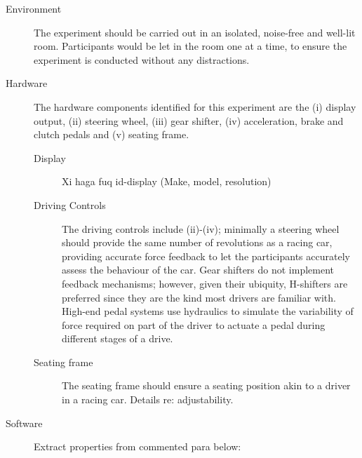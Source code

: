 \begin{description}
	\item [Environment] The experiment should be carried out in an isolated, noise-free and well-lit room. Participants would be let in the room one at a time, to ensure the experiment is conducted without any distractions.
	\item [Hardware] The hardware components identified for this experiment are the (i) display output, (ii) steering wheel, (iii) gear shifter, (iv) acceleration, brake and clutch pedals and (v) seating frame.
	\begin{description}
		\item [Display] Xi haga fuq id-display (Make, model, resolution)
		\item [Driving Controls] The driving controls include (ii)-(iv); minimally a steering wheel should provide the same number of revolutions as a racing car, providing accurate force feedback to let the participants accurately assess the behaviour of the car. Gear shifters do not implement feedback mechanisms; however, given their ubiquity, H-shifters are preferred since they are the kind most drivers are familiar with. High-end pedal systems use hydraulics to simulate the variability of force required on part of the driver to actuate a pedal during different stages of a drive.
		\item [Seating frame] The seating frame should ensure a seating position akin to a driver in a racing car. Details re: adjustability.
	\end{description}
	\item [Software] Extract properties from commented para below:
\end{description}

